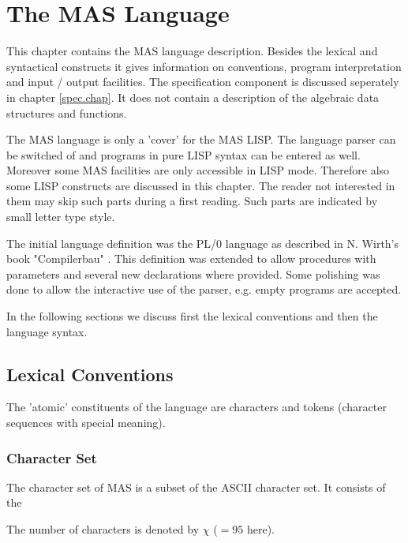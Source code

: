 
\chapter{The MAS Language}

\label{lang.chap}
This chapter contains the MAS language description. 
Besides the lexical and syntactical constructs it gives 
information on conventions, program interpretation 
and input / output facilities.  
The specification component is discussed 
seperately in chapter \ref{spec.chap}.
It does not contain a description of the 
algebraic data structures and functions.

The MAS language is only a 'cover' for the MAS LISP.
The language parser can be switched of and 
programs in pure LISP syntax can be entered as well.
Moreover some MAS facilities are only 
accessible in LISP mode. Therefore also
some LISP constructs are discussed in this chapter.
The reader not interested in them may skip such 
parts during a first reading.
{\small Such parts are indicated by small letter type style.}

The initial language definition  
was the PL/0 language  
as described in N. Wirth's book "Compilerbau" 
\cite{Wirth 85b}.
This definition was extended to allow procedures with 
parameters and several new declarations where provided.
Some polishing was done to allow the interactive  
use of the parser, e.g. empty programs are accepted.

In the following sections we discuss 
first the lexical conventions and then 
the language syntax.


\section{Lexical Conventions}

The 'atomic' constituents of the language are characters and
tokens (character sequences with special meaning).

\subsection{Character Set}

The character set of MAS is a subset of the ASCII character set.
It consists of the 
\begin{deflist}{letter}
\item[digits] \verb/0123456789/
\item[letters] \verb/aAbBcCdDeEfFgGhHiIjJkKlLmMnNoOpPqQrRsStTuUvVwWxXyYzZ/
\item[others] \verb*0.,=+-*/$() !"#%&':;<>?@[\]^_`{}|~0
\end{deflist}
The number of characters is denoted by $\chi$ ($=95$ here).


